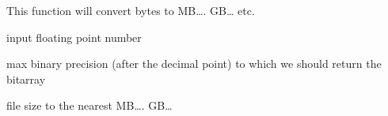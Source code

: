 \documentclass[letterpaper,10pt,english]{sphinxmanual}
\begin{document}
\begin{fulllineitems}
\label{\detokenize{utils:utils.file_utils.convert_bytes}}
\pysigstartsignatures
{}
\pysigstopsignatures
\sphinxAtStartPar
This function will convert bytes to MB…. GB… etc.
\begin{description}
\begin{description}
\sphinxAtStartPar
input floating point number

\sphinxAtStartPar
max binary precision (after the decimal point) to which we should return the bitarray

\end{description}

\begin{description}
\sphinxAtStartPar
file size to the nearest MB…. GB…

\end{description}

\end{description}

\begin{sphinxVerbatim}[commandchars=\\\{\}]
\end{sphinxVerbatim}

\end{fulllineitems}

\end{document}
